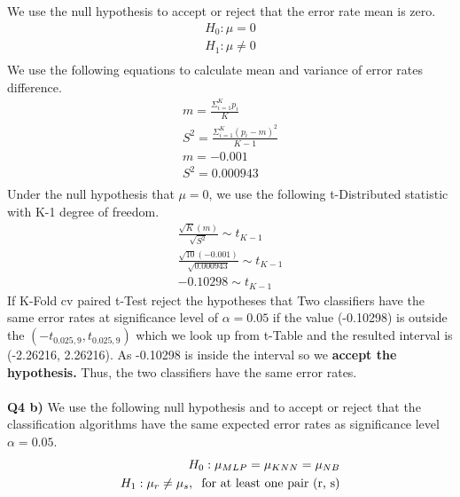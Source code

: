 \documentclass[12pt]{article}
\begin{document}
We use the null hypothesis to accept or reject that the error rate mean is zero.
\begin{equation}
	\begin{aligned}
		H_0 : \mu = 0 \\
		H_1 : \mu \neq 0 \\
	\end{aligned}
\end{equation}
We use the following equations to calculate mean and variance of error rates difference.
\begin{equation}
	\begin{aligned}
		m = \frac{\Sigma_{i=1}^K p_i}{K} \\
		S^2 = \frac{\Sigma_{i=1}^K (p_i - m)^2}{K-1} \\
		m = -0.001 \\
		S^2 = 0.000943 \\
	\end{aligned}
\end{equation}
Under the null hypothesis that $\mu = 0$, we use the following t-Distributed statistic with K-1 degree of freedom. 
\begin{equation}
	\begin{aligned}
		\frac{\sqrt{K} (m)}{\sqrt{S^2}} \sim t_{K-1} \\
		\frac{\sqrt{10} (-0.001)}{\sqrt{0.000943}} \sim t_{K-1} \\
		-0.10298 \sim t_{K-1}
	\end{aligned}
\end{equation}
If K-Fold cv paired t-Test reject the hypotheses that Two classifiers have the same error rates at significance level of $\alpha=0.05$ if the value (-0.10298) is outside the $(-t_{0.025,9}, t_{0.025,9})$ which we look up from t-Table and the resulted interval is (-2.26216, 2.26216). As -0.10298 is inside the interval so we \textbf{accept the hypothesis.} Thus, the two classifiers have the same error rates.\\ \\
\textbf{Q4 b)} We use the following null hypothesis and to accept or reject that the classification algorithms have the same expected error rates as significance level $\alpha=0.05$.
\begin{equation}
	\begin{aligned}
		H_0 : \mu_{MLP} = \mu_{KNN} = \mu_{NB} \\
		H_1 : \mu_{r} \neq \mu_{s}, \hspace{0.2cm} \text{for at least one pair (r, s)} \\
	\end{aligned}
\end{equation}
\end{document}
